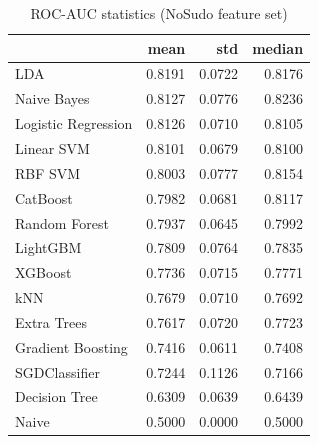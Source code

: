 \begin{table}
\caption{ROC-AUC statistics (NoSudo feature set)}
\label{tab:roc-auc_NoSudo_stats}
\begin{tabular}{lrrr}
\toprule
 & mean & std & median \\
\midrule
LDA & 0.8191 & 0.0722 & 0.8176 \\
Naive Bayes & 0.8127 & 0.0776 & 0.8236 \\
Logistic Regression & 0.8126 & 0.0710 & 0.8105 \\
Linear SVM & 0.8101 & 0.0679 & 0.8100 \\
RBF SVM & 0.8003 & 0.0777 & 0.8154 \\
CatBoost & 0.7982 & 0.0681 & 0.8117 \\
Random Forest & 0.7937 & 0.0645 & 0.7992 \\
LightGBM & 0.7809 & 0.0764 & 0.7835 \\
XGBoost & 0.7736 & 0.0715 & 0.7771 \\
kNN & 0.7679 & 0.0710 & 0.7692 \\
Extra Trees & 0.7617 & 0.0720 & 0.7723 \\
Gradient Boosting & 0.7416 & 0.0611 & 0.7408 \\
SGDClassifier & 0.7244 & 0.1126 & 0.7166 \\
Decision Tree & 0.6309 & 0.0639 & 0.6439 \\
Naive & 0.5000 & 0.0000 & 0.5000 \\
\bottomrule
\end{tabular}
\end{table}
